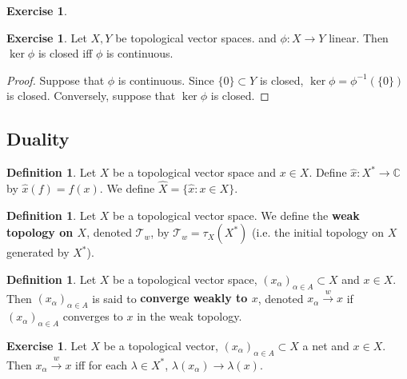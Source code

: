 \documentclass[12pt]{amsart}
\theoremstyle{definition}
\newtheorem{defn}[definition]{Definition}
\newtheorem{ex}[definition]{Exercise}
\newcommand{\al}{\alpha}
\newcommand{\lam}{\lambda}
\newcommand{\C}{\mathbb{C}}
\newcommand{\MT}{\mathcal{T}}
\newcommand{\conv}[1]{\xrightarrow{#1}}
\newcommand{\lex}[1]{\label{ex:#1}}
\begin{document}
	\begin{ex}
		
	\end{ex}
	
	\begin{ex}
		Let $X, Y$ be topological vector spaces.  and $\phi: X \rightarrow Y$ linear. Then $\ker \phi$ is closed iff $\phi$ is continuous. 
	\end{ex}
	
	\begin{proof}
		Suppose that $\phi$ is continuous. Since $\{0\} \subset Y$ is closed, $\ker \phi = \phi^{-1}(\{0\})$ is closed. Conversely, suppose that $\ker \phi$ is closed. 
	\end{proof}
	
	
	
	
	
	
	
	
	
	
	
	
	
	
	
	
	
	
	
	
	
	
	
	\newpage
	\subsection{Duality}
	
	\begin{defn}
		Let $X$ be a topological vector space and $x \in X$. Define $\hat{x}:X^* \rightarrow \C$ by $\hat{x}(f) = f(x)$. We define $\hat{X} = \{\hat{x}: x \in X\}$.
	\end{defn}

	\begin{defn}
		Let $X$ be a topological vector space. We define the \textbf{weak topology on $X$}, denoted $\MT_w$, by $\MT_w = \tau_X(X^*)$ (i.e. the initial topology on $X$ generated by $X^*$).
	\end{defn}

	\begin{defn}
		Let $X$ be a topological vector space, $(x_{\al})_{\al \in A} \subset X$ and $x \in X$. Then $(x_{\al})_{\al \in A}$ is said to \textbf{converge weakly to $x$}, denoted $x_{\al} \conv{w} x$ if $(x_{\al})_{\al \in A}$ converges to $x$ in the weak topology.
	\end{defn}
	
	\begin{ex} \lex{}
		Let $X$ be a topological vector, $(x_{\al})_{\al \in A} \subset X$ a net and $x \in X$. Then $x_{\al} \conv{w} x$ iff for each $\lam \in X^*$, $ \lam (x_{\al}) \rightarrow \lam(x)$. 
	\end{ex}
	
\end{document}
